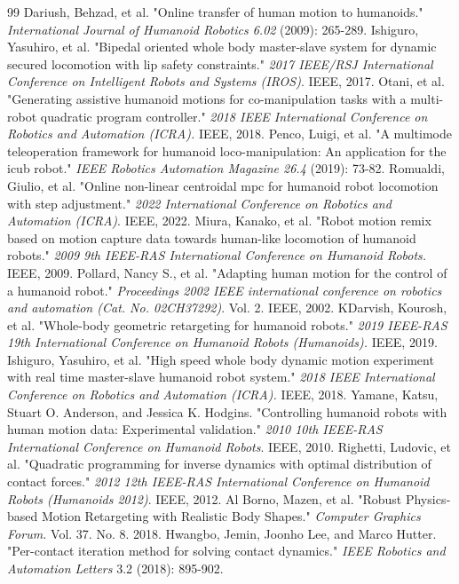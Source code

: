 \documentclass[a4paper, 10pt, conference]{ieeeconf}      %
\begin{document}
\begin{thebibliography}{99}
 Dariush, Behzad, et al. "Online transfer of human motion to humanoids." \textit{International Journal of Humanoid Robotics 6.02} (2009): 265-289.
Ishiguro, Yasuhiro, et al. "Bipedal oriented whole body master-slave system for dynamic secured locomotion with lip safety constraints." \textit{2017 IEEE/RSJ International Conference on Intelligent Robots and Systems (IROS)}. IEEE, 2017.
 Otani, et al. "Generating assistive humanoid motions for co-manipulation tasks with a multi-robot quadratic program controller." \textit{2018 IEEE International Conference on Robotics and Automation (ICRA).} IEEE, 2018.
 Penco, Luigi, et al. "A multimode teleoperation framework for humanoid loco-manipulation: An application for the icub robot." \textit{IEEE Robotics Automation Magazine 26.4 }(2019): 73-82.
 Romualdi, Giulio, et al. "Online non-linear centroidal mpc for humanoid robot locomotion with step adjustment." \textit{2022 International Conference on Robotics and Automation (ICRA)}. IEEE, 2022.
 Miura, Kanako, et al. "Robot motion remix based on motion capture data towards human-like locomotion of humanoid robots." \textit{2009 9th IEEE-RAS International Conference on Humanoid Robots. }IEEE, 2009. 
 Pollard, Nancy S., et al. "Adapting human motion for the control of a humanoid robot." \textit{Proceedings 2002 IEEE international conference on robotics and automation (Cat. No. 02CH37292)}. Vol. 2. IEEE, 2002.
 KDarvish, Kourosh, et al. "Whole-body geometric retargeting for humanoid robots." \textit{2019 IEEE-RAS 19th International Conference on Humanoid Robots (Humanoids). }IEEE, 2019.
 Ishiguro, Yasuhiro, et al. "High speed whole body dynamic motion experiment with real time master-slave humanoid robot system." \textit{2018 IEEE International Conference on Robotics and Automation (ICRA).} IEEE, 2018.
 Yamane, Katsu, Stuart O. Anderson, and Jessica K. Hodgins. "Controlling humanoid robots with human motion data: Experimental validation." \textit{2010 10th IEEE-RAS International Conference on Humanoid Robots}. IEEE, 2010.
 Righetti, Ludovic, et al. "Quadratic programming for inverse dynamics with optimal distribution of contact forces." \textit{2012 12th IEEE-RAS International Conference on Humanoid Robots (Humanoids 2012)}. IEEE, 2012.
 Al Borno, Mazen, et al. "Robust Physics‐based Motion Retargeting with Realistic Body Shapes." \textit{Computer Graphics Forum.} Vol. 37. No. 8. 2018.
 Hwangbo, Jemin, Joonho Lee, and Marco Hutter. "Per-contact iteration method for solving contact dynamics." \textit{IEEE Robotics and Automation Letters }3.2 (2018): 895-902.

\end{thebibliography}
\end{document}

